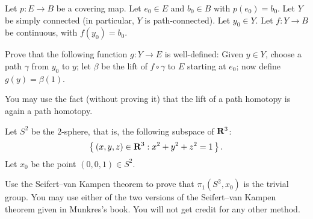 \begin{problem}
  Let $p\colon E\to B$ be a covering map. Let $e_0\in E$ and $b_0\in B$
  with $p(e_0)=b_0$. Let $Y$ be simply connected (in particular, $Y$ is
  path-connected). Let $y_0\in Y$. Let $f\colon Y\to B$ be continuous, with
  $f(y_0)=b_0$.

  Prove that the following function $g\colon Y\to E$ is well-defined: Given
  $y\in Y$, choose a path $\gamma$ from $y_0$ to $y$; let $\beta$ be the
  lift of $f\circ\gamma$ to $E$ starting at $e_0$; now define
  $g(y)=\beta(1)$.

  You may use the fact (without proving it) that the lift of a path
  homotopy is again a path homotopy.
\end{problem}
\begin{solution}
\end{solution}

\begin{problem}
  Let $S^2$ be the $2$-sphere, that is, the following subspace of $\mathbf{R}^3$:
  \[
    \left\{\,(x,y,z)\in\mathbf{R}^3:x^2+y^2+z^2=1\,\right\}.
  \]
  Let $x_0$ be the point $(0,0,1)\in S^2$.

  Use the Seifert--van Kampen theorem to prove that $\pi_1(S^2,x_0)$ is the
  trivial group. You may use either of the two versions of the Seifert--van
  Kampen theorem given in Munkres's book. You will not get credit for any
  other method.
\end{problem}
\begin{solution}
\end{solution}

